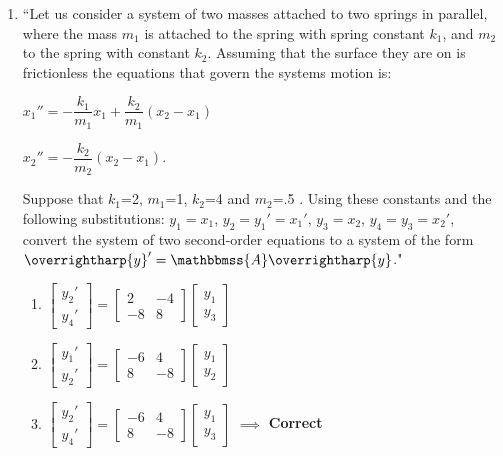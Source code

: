 \documentclass[11pt]{article}
\begin{document}
\begin{enumerate}
		\item ``Let us consider a system of two masses attached to two springs in parallel, where the mass $m_1$ is attached to the spring with spring constant $k_1$, and $m_2$ to the spring with constant $k_2$.  Assuming that the surface they are on is frictionless the equations that govern the systems motion is:
			
			
			\begin{centering}
				\(x_{1}''=-\dfrac{k_1}{m_1}x_1+\dfrac{k_2}{m_1}\left(x_2-x_1\right)\) 
				
				\(x_{2}''=-\dfrac{k_2}{m_2}\left(x_2-x_1\right)\).
			
			\end{centering}
			
			Suppose that $k_1$=2, $m_1$=1, $k_2$=4 and $m_2$=.5 . Using these constants and the following substitutions: $y_1=x_1$, $y_2=y_{1}'=x_{1}'$, $y_3=x_2$, $y_4=y_3=x_{2}'$, convert the system of two second-order equations to a system of the form $\overrightharp{y}'=\mathbbmss{A}\overrightharp{y}$."
			
				\begin{enumerate}
					\item \(\begin{bmatrix} y_{2}' \\ y_{4}' \end{bmatrix}=\begin{bmatrix} 2 & -4 \\ -8 & 8 \end{bmatrix} \begin{bmatrix} y_1 \\ y_3 \end{bmatrix}\)
					
					\item \(\begin{bmatrix} y_{1}' \\ y_{2}' \end{bmatrix}=\begin{bmatrix} -6 & 4 \\ 8 & -8 \end{bmatrix} \begin{bmatrix} y_1 \\ y_2 \end{bmatrix}\)
					
					\item \(\begin{bmatrix} y_{2}' \\ y_{4}' \end{bmatrix}=\begin{bmatrix} -6 & 4 \\ 8 & -8 \end{bmatrix} \begin{bmatrix} y_1 \\ y_3 \end{bmatrix}\) $\implies$ \textbf{Correct}
					

\end{enumerate}
\end{enumerate}
\end{document}
